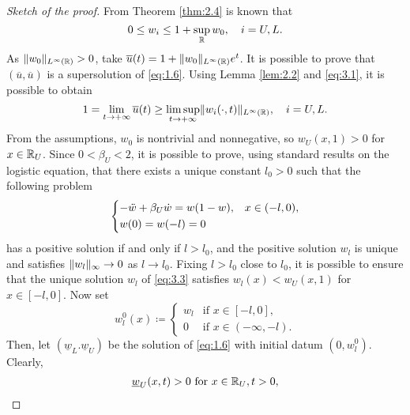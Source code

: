\begin{proof}[Sketch of the proof]
    From Theorem \ref{thm:2.4} is known that 
    \begin{equation}
        0 \leq w_{i} \leq 1 + \sup_{\mathbb{R}} w_{0}, \quad i = U, L.
        \label{eq:3.1}
    \end{equation}
    As \(\lVert w_{0}\rVert_{L^{\infty}(\mathbb{R})} > 0\), take \(\overline{u}(t) = 1 + \lVert w_{0}\rVert_{L^{\infty}(\mathbb{R})}e^{t}\). 
    It is possible to prove that \((\overline{u}, \overline{u})\) is a supersolution of \eqref{eq:1.6}. Using Lemma \ref{lem:2.2} and \eqref{eq:3.1}, it is possible to obtain 
    \begin{equation}
        1 = \lim_{t \to +\infty} \overline{u}(t) \geq \limsup_{t \to +\infty} \lVert w_i(\cdot, t)\rVert_{L^{\infty}(\mathbb{R})}, \quad i = U, L.
        \label{eq:3.2}
    \end{equation}
    From the assumptions, \(w_0\) is nontrivial and nonnegative, so \(w_U(x, 1) > 0\) for \(x \in \mathbb{R}_U\). Since \(0 < \beta_U < 2\), it is possible to prove, using standard results on the logistic equation, that there exists a unique constant \(l_0 > 0\) such that the following problem
    \begin{equation}
        \begin{dcases}
            -\ddot{w} + \beta_U \dot{w} = w(1 - w), & x \in (-l, 0), \\
            w(0) = w(-l) = 0
        \end{dcases}
        \label{eq:3.3}
    \end{equation}
    has a positive solution if and only if \(l > l_0\), and the positive solution \(w_l\) is unique and satisfies \(\lVert w_l\rVert_\infty \to 0\) as \(l \to l_0\). Fixing \(l > l_0\) close to \(l_0\), it is possible to ensure that the unique solution \(w_l\) of \eqref{eq:3.3} satisfies \(w_l(x) < w_U(x, 1)\) for \(x \in [-l, 0]\). Now set 
    \begin{equation*}
        w_l^0(x) \coloneqq \begin{cases}
            w_l & \text{if } x \in [-l, 0], \\
            0 & \text{if } x \in (-\infty, -l).
        \end{cases}
    \end{equation*}
    Then, let \((\underline{w}_L. \underline{w}_U)\) be the solution of \eqref{eq:1.6} with initial datum \((0, w_l^0)\). Clearly,
    \begin{align*}
        \underline{w}_U(x, t) > 0 & \text{ for } x \in \real_U, t > 0, \\

\end{align*}
\end{proof}
